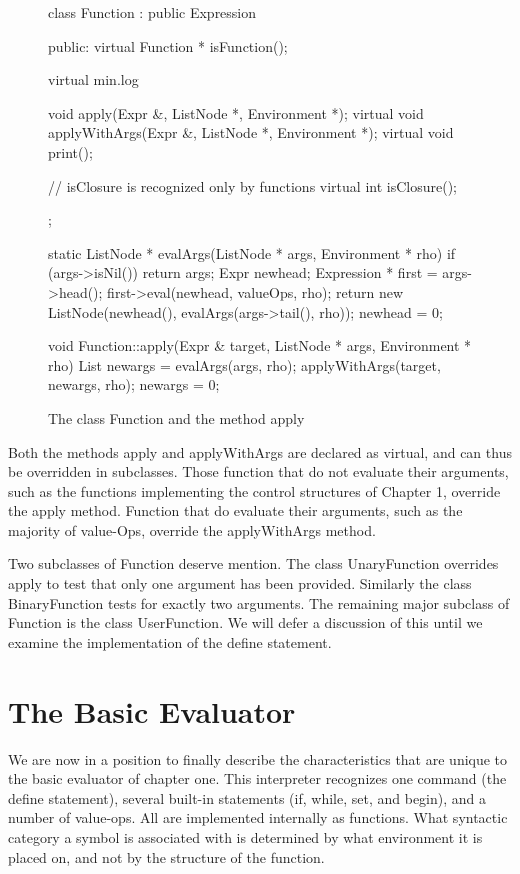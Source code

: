 \begin{figure}
\begin{cprog}
class Function : public Expression {
public:
	virtual Function * isFunction();

	virtual min.log
	
	void apply(Expr &, ListNode *, Environment *);
	virtual void applyWithArgs(Expr &, ListNode *, Environment *);
	virtual void print();

	// isClosure is recognized only by functions
	virtual int isClosure();
};

static ListNode * evalArgs(ListNode * args, Environment * rho)
{
	if (args->isNil())
		return args;
	Expr newhead;
	Expression * first = args->head();
	first->eval(newhead, valueOps, rho);
	return new ListNode(newhead(), evalArgs(args->tail(), rho));
	newhead = 0;
}

void Function::apply(Expr & target, ListNode * args, Environment * rho)
{
	List newargs = evalArgs(args, rho);
	applyWithArgs(target, newargs, rho);
	newargs = 0;
}
\end{cprog}
\caption{The class {\sf Function} and the method {\sf apply}}\label{function}
\end{figure}

Both the methods {\sf apply} and {\sf applyWithArgs} are declared as
virtual, and can thus be overridden in subclasses.  Those function that do
not evaluate their arguments, such as the functions implementing the
control structures of Chapter 1, override the {\sf apply} method.
Function that do evaluate their arguments, such as the majority of
value-Ops, override the {\sf applyWithArgs} method.

Two subclasses of {\sf Function} deserve mention.  The class 
{\sf UnaryFunction} overrides {\sf apply} to test that only one argument 
has been provided.  Similarly the class {\sf BinaryFunction} tests for
exactly two arguments.  
The remaining major subclass of {\sf Function} is the class {\sf
UserFunction}.  We will defer a discussion of this until we examine
the implementation of the {\sf define} statement.

\section{The Basic Evaluator}

We are now in a position to finally describe the characteristics that are
unique to the basic evaluator of chapter one.  This interpreter recognizes
one command (the {\sf define} statement), several built-in statements
({\sf if, while, set}, and {\sf begin}), and a number of value-ops.
All are implemented internally as functions.  What syntactic category a
symbol is associated with is
determined by what environment it is placed on, and not by the
structure of the function.

